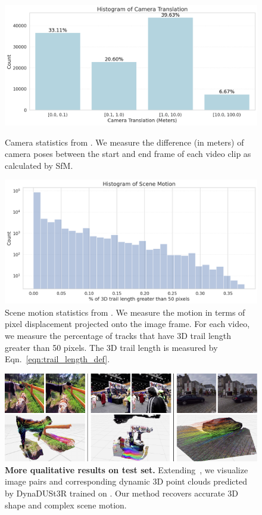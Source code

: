 \begin{figure}[t]
    \centering
    \includegraphics[width=\linewidth]{fig/supp/camera_stats.png}
    \caption{Camera statistics from \dataset. We measure the difference (in meters) of camera poses between the start and end frame of each video clip as calculated by SfM.}
    \label{fig:supp:camera_stats}

    \centering
    \includegraphics[width=\linewidth]{fig/supp/track_stats.png}
    \caption{Scene motion statistics from \dataset. We measure the motion in terms of pixel displacement projected onto the image frame. For each video, we measure the percentage of tracks that have 3D trail length greater than 50 pixels. The 3D trail length is measured by Eqn.~\ref{eqn:trail_length_def}. }
    \label{fig:supp:motion_stats}
\end{figure}

\begin{figure}[ht]
    \centering
    \includegraphics[width=\textwidth]{fig/supp/qualitative-stereo4d.pdf}
    \caption{\textbf{More qualitative results on \dataset test set.} Extending~, we visualize image pairs and corresponding dynamic 3D point clouds predicted by DynaDUSt3R trained on \dataset. Our method recovers accurate 3D shape and complex scene motion.}
\label{fig:supp:qualitative-stereo4d}
\end{figure}


